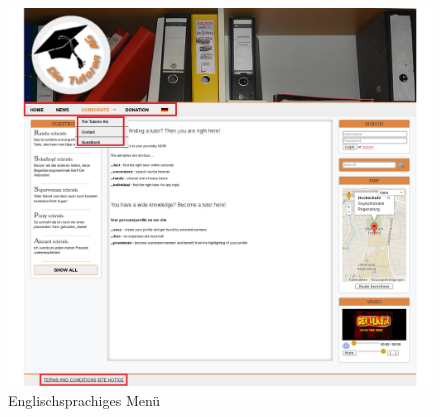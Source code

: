 \begin{figure}[!htbp]
 \centering
 \includegraphics[width=1\textwidth]{../Screenshots/en/Home_menu}
 \caption{Englischsprachiges Menü}
 \label{fig:Home_menu}
\end{figure}